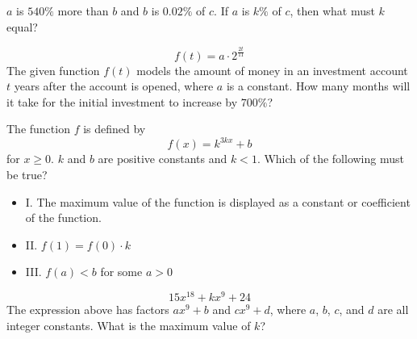 \vspace{2em}
\newpage

\noindent\markforreview
\vspace{1em}

\(a\) is \(540\%\) more than \(b\) and \(b\) is \(0.02\%\) of \(c\). If \(a\) is \(k\%\) of \(c\), then what must \(k\) equal?

\vspace{2em}
\newpage

\noindent\markforreview
\vspace{1em}

\[
f(t) = a \cdot 2^{\frac{2t}{11}}
\]
The given function \(f(t)\) models the amount of money in an investment account \(t\) years after the account is opened, where \(a\) is a constant. How many months will it take for the initial investment to increase by \(700\%\)?

\vspace{2em}
\newpage

\noindent\markforreview
\vspace{1em}

The function \(f\) is defined by
\[
f(x) = k^{3kx} + b
\]
for \(x \ge 0\). \(k\) and \(b\) are positive constants and \(k < 1\). Which of the following must be true?

\begin{itemize}
\item I. The maximum value of the function is displayed as a constant or coefficient of the function.
\item II. \(f(1) = f(0) \cdot k\)
\item III. \(f(a) < b\) for some \(a > 0\)
\end{itemize}

\vspace{0.75em}


\vspace{2em}
\newpage

\noindent\markforreview
\vspace{1em}

\[
15x^{18} + kx^{9} + 24
\]
The expression above has factors \(ax^{9} + b\) and \(cx^{9} + d\), where \(a\), \(b\), \(c\), and \(d\) are all integer constants. What is the maximum value of \(k\)?

\vspace{2em}
\newpage

